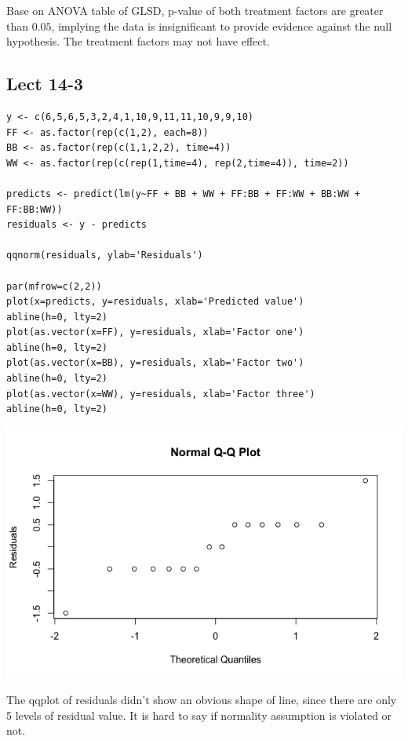 \documentclass[11pt,letterpaper]{article}
\begin{document}
\noindent Base on ANOVA table of GLSD, p-value of both treatment factors are greater than $0.05$, implying the data is insignificant to provide evidence against the null hypothesis. The treatment factors may not have effect. 

\afterpage{\null\newpage}
\newpage

\subsection*{Lect 14-3}
\begin{verbatim}
y <- c(6,5,6,5,3,2,4,1,10,9,11,11,10,9,9,10)
FF <- as.factor(rep(c(1,2), each=8))
BB <- as.factor(rep(c(1,1,2,2), time=4))
WW <- as.factor(rep(c(rep(1,time=4), rep(2,time=4)), time=2))

predicts <- predict(lm(y~FF + BB + WW + FF:BB + FF:WW + BB:WW + FF:BB:WW))
residuals <- y - predicts

qqnorm(residuals, ylab='Residuals')

par(mfrow=c(2,2))
plot(x=predicts, y=residuals, xlab='Predicted value')
abline(h=0, lty=2)
plot(as.vector(x=FF), y=residuals, xlab='Factor one')
abline(h=0, lty=2)
plot(as.vector(x=BB), y=residuals, xlab='Factor two')
abline(h=0, lty=2)
plot(as.vector(x=WW), y=residuals, xlab='Factor three')
abline(h=0, lty=2)

\end{verbatim}

\includegraphics[scale=0.55]{lect-14-3-b-qqplot.png}

\noindent The qqplot of residuals didn't show an obvious shape of line, since there are only 5 levels of residual value. It is hard to say if normality assumption is violated or not. 
\end{document}
